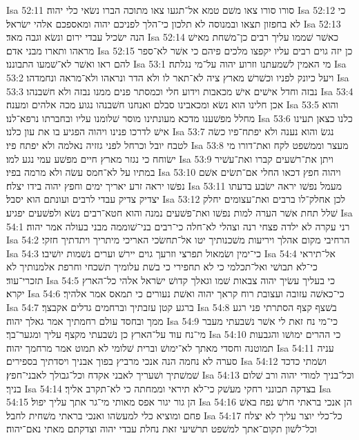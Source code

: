 Isa 52:11  סורו סורו צאו משׁם טמא אל־תגעו צאו מתוכה הברו נשׂאי כלי יהוה׃
Isa 52:12  כי לא בחפזון תצאו ובמנוסה לא תלכון כי־הלך לפניכם יהוה ומאספכם אלהי ישׂראל׃
Isa 52:13  הנה ישׂכיל עבדי ירום ונשׂא וגבה מאד׃
Isa 52:14  כאשׁר שׁממו עליך רבים כן־משׁחת מאישׁ מראהו ותארו מבני אדם׃
Isa 52:15  כן יזה גוים רבים עליו יקפצו מלכים פיהם כי אשׁר לא־ספר להם ראו ואשׁר לא־שׁמעו התבוננו׃
Isa 53:1  מי האמין לשׁמעתנו וזרוע יהוה על־מי נגלתה׃
Isa 53:2  ויעל כיונק לפניו וכשׁרשׁ מארץ ציה לא־תאר לו ולא הדר ונראהו ולא־מראה ונחמדהו׃
Isa 53:3  נבזה וחדל אישׁים אישׁ מכאבות וידוע חלי וכמסתר פנים ממנו נבזה ולא חשׁבנהו׃
Isa 53:4  אכן חלינו הוא נשׂא ומכאבינו סבלם ואנחנו חשׁבנהו נגוע מכה אלהים ומענה׃
Isa 53:5  והוא מחלל מפשׁענו מדכא מעונתינו מוסר שׁלומנו עליו ובחברתו נרפא־לנו׃
Isa 53:6  כלנו כצאן תעינו אישׁ לדרכו פנינו ויהוה הפגיע בו את עון כלנו׃
Isa 53:7  נגשׂ והוא נענה ולא יפתח־פיו כשׂה לטבח יובל וכרחל לפני גזזיה נאלמה ולא יפתח פיו׃
Isa 53:8  מעצר וממשׁפט לקח ואת־דורו מי ישׂוחח כי נגזר מארץ חיים מפשׁע עמי נגע למו׃
Isa 53:9  ויתן את־רשׁעים קברו ואת־עשׁיר במתיו על לא־חמס עשׂה ולא מרמה בפיו׃
Isa 53:10  ויהוה חפץ דכאו החלי אם־תשׂים אשׁם נפשׁו יראה זרע יאריך ימים וחפץ יהוה בידו יצלח׃
Isa 53:11  מעמל נפשׁו יראה ישׂבע בדעתו יצדיק צדיק עבדי לרבים ועונתם הוא יסבל׃
Isa 53:12  לכן אחלק־לו ברבים ואת־עצומים יחלק שׁלל תחת אשׁר הערה למות נפשׁו ואת־פשׁעים נמנה והוא חטא־רבים נשׂא ולפשׁעים יפגיע׃
Isa 54:1  רני עקרה לא ילדה פצחי רנה וצהלי לא־חלה כי־רבים בני־שׁוממה מבני בעולה אמר יהוה׃
Isa 54:2  הרחיבי מקום אהלך ויריעות משׁכנותיך יטו אל־תחשׂכי האריכי מיתריך ויתדתיך חזקי׃
Isa 54:3  כי־ימין ושׂמאול תפרצי וזרעך גוים יירשׁ וערים נשׁמות יושׁיבו׃
Isa 54:4  אל־תיראי כי־לא תבושׁי ואל־תכלמי כי לא תחפירי כי בשׁת עלומיך תשׁכחי וחרפת אלמנותיך לא תזכרי־עוד׃
Isa 54:5  כי בעליך עשׂיך יהוה צבאות שׁמו וגאלך קדושׁ ישׂראל אלהי כל־הארץ יקרא׃
Isa 54:6  כי־כאשׁה עזובה ועצובת רוח קראך יהוה ואשׁת נעורים כי תמאס אמר אלהיך׃
Isa 54:7  ברגע קטן עזבתיך וברחמים גדלים אקבצך׃
Isa 54:8  בשׁצף קצף הסתרתי פני רגע ממך ובחסד עולם רחמתיך אמר גאלך יהוה׃
Isa 54:9  כי־מי נח זאת לי אשׁר נשׁבעתי מעבר מי־נח עוד על־הארץ כן נשׁבעתי מקצף עליך ומגער־בך׃
Isa 54:10  כי ההרים ימושׁו והגבעות תמוטנה וחסדי מאתך לא־ימושׁ וברית שׁלומי לא תמוט אמר מרחמך יהוה׃
Isa 54:11  עניה סערה לא נחמה הנה אנכי מרביץ בפוך אבניך ויסדתיך בספירים׃
Isa 54:12  ושׂמתי כדכד שׁמשׁתיך ושׁעריך לאבני אקדח וכל־גבולך לאבני־חפץ׃
Isa 54:13  וכל־בניך למודי יהוה ורב שׁלום בניך׃
Isa 54:14  בצדקה תכונני רחקי מעשׁק כי־לא תיראי וממחתה כי לא־תקרב אליך׃
Isa 54:15  הן גור יגור אפס מאותי מי־גר אתך עליך יפול׃
Isa 54:16  הן אנכי בראתי חרשׁ נפח באשׁ פחם ומוציא כלי למעשׂהו ואנכי בראתי משׁחית לחבל׃
Isa 54:17  כל־כלי יוצר עליך לא יצלח וכל־לשׁון תקום־אתך למשׁפט תרשׁיעי זאת נחלת עבדי יהוה וצדקתם מאתי נאם־יהוה׃
